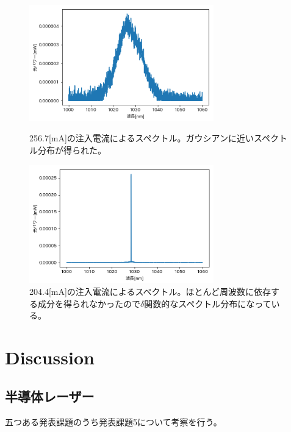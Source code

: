 \documentclass[titlepage]{jsarticle}
\begin{document}
\begin{figure}[htbp]
 \begin{minipage}{0.5\hsize}
  \begin{center}
   \includegraphics[width=80mm]{256_7[mA].png}
  \end{center}
  \caption{256.7[mA]の注入電流によるスペクトル。ガウシアンに近いスペクトル分布が得られた。}
  \label{fig:256_7}
 \end{minipage}
 \begin{minipage}{0.5\hsize}
  \begin{center}
   \includegraphics[width=80mm]{204_4[mA].png}
  \end{center}
  \caption{204.4[mA]の注入電流によるスペクトル。ほとんど周波数に依存する成分を得られなかったので$\delta$関数的なスペクトル分布になっている。}
  \label{fig:204_4}
 \end{minipage}
\end{figure}
\clearpage
\section{Discussion}
\subsection{半導体レーザー}
五つある発表課題のうち発表課題5について考察を行う。\\
\end{document}
